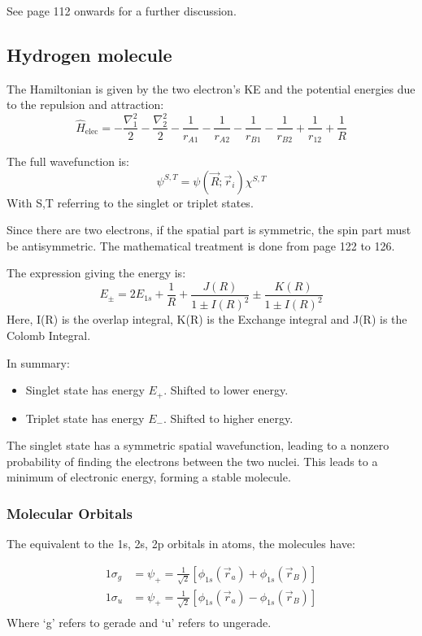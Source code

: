\documentclass[12pt]{article}
\begin{document}
See page 112 onwards for a further discussion. 

\subsection{Hydrogen molecule}
The Hamiltonian is given by the two electron's KE and the potential energies due to the repulsion and attraction:
\[\hat{H}_\text{elec} = -\frac{\nabla^2_1}{2} - \frac{\nabla_2^2}{2} - \frac{1}{r_{A1}} - \frac{1}{r_{A2}} - \frac{1}{r_{B1}} - \frac{1}{r_{B2}} + \frac{1}{r_{12}} + \frac{1}{R}\]

The full wavefunction is:
\[\psi^{S,T} = \psi(\vec{R};\vec{r}_i)\chi^{S,T}\]
With S,T referring to the singlet or triplet states.

Since there are two electrons, if the spatial part is symmetric, the spin part must be antisymmetric. The mathematical treatment is done from page 122 to 126. 

The expression giving the energy is:
\[E_\pm = 2E_{1s} + \frac1R + \frac{J(R)}{1\pm I(R)^2} \pm \frac{K(R)}{1\pm I(R)^2}\] 
Here, I(R) is the overlap integral, K(R) is the Exchange integral and J(R) is the Colomb Integral.

In summary:
\begin{itemize}
    \item Singlet state has energy $E_+$. Shifted to lower energy.
    \item Triplet state has energy $E_-$. Shifted to higher energy. 
\end{itemize}
The singlet state has a symmetric spatial wavefunction, leading to a nonzero probability of finding the electrons between the two nuclei. This leads to a minimum of electronic energy, forming a stable molecule. 

\subsubsection{Molecular Orbitals}
The equivalent to the 1s, 2s, 2p orbitals in atoms, the molecules have:

\begin{align*}
    1\sigma_g &= \psi_+ = \frac{1}{\sqrt{2}}[\phi_{1s}(\vec{r}_a)+\phi_{1s}(\vec{r}_B)]\\
    1\sigma_u &= \psi_+ = \frac{1}{\sqrt{2}}[\phi_{1s}(\vec{r}_a)-\phi_{1s}(\vec{r}_B)]\\
\end{align*}
Where `g' refers to gerade and `u' refers to ungerade.
\end{document}
